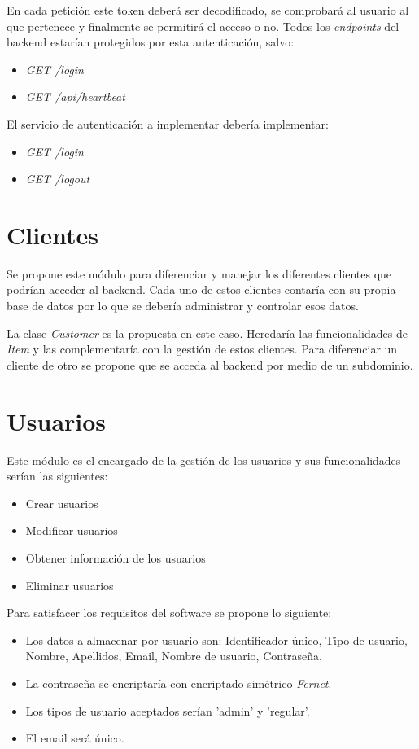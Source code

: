 En cada petición este token deberá ser decodificado, se comprobará al usuario al que pertenece y finalmente se permitirá el acceso o no. Todos los \textit{endpoints} del backend estarían protegidos por esta autenticación, salvo:
\begin{itemize}
	\item \textit{GET /login}
	\item \textit{GET /api/heartbeat}
\end{itemize}


\bigskip
El servicio de autenticación a implementar debería implementar:
\begin{itemize}
	\item \textit{GET /login}
	\item \textit{GET /logout}
\end{itemize}



\section{Clientes}

Se propone este módulo para diferenciar y manejar los diferentes clientes que podrían acceder al backend. Cada uno de estos clientes contaría con su propia base de datos por lo que se debería administrar y controlar esos datos.

La clase \textit{Customer} es la propuesta en este caso. Heredaría las funcionalidades de \textit{Item} y las complementaría con la gestión de estos clientes. Para diferenciar un cliente de otro se propone que se acceda al backend por medio de un subdominio.



\section{Usuarios}

Este módulo es el encargado de la gestión de los usuarios y sus funcionalidades serían las siguientes:
\begin{itemize}
	\item Crear usuarios
	\item Modificar usuarios
	\item Obtener información de los usuarios
	\item Eliminar usuarios
\end{itemize}


\bigskip
Para satisfacer los requisitos del software se propone lo siguiente:
\begin{itemize}
	\item Los datos a almacenar por usuario son: Identificador único, Tipo de usuario, Nombre, Apellidos, Email, Nombre de usuario, Contraseña.
	\item La contraseña se encriptaría con encriptado simétrico \textit{Fernet}.
	\item Los tipos de usuario aceptados serían 'admin' y 'regular'.
	\item El email será único.
\end{itemize}




